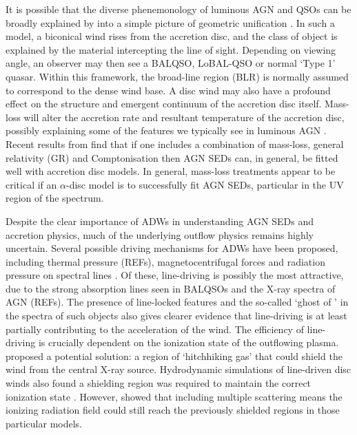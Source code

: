 \documentclass[useAMS,usenatbib]{mn2e_x}
\begin{document}
It is possible that the  diverse phenemonology
of luminous AGN and QSOs can be broadly explained by
into a simple picture of geometric unification \citep[e.g.][]{MCGV95, elvis2000}. 
In such a model, a biconical wind rises from 
the accretion disc, and the class of object is explained by the material
intercepting the line of sight. Depending on viewing angle, an observer 
may then see a BALQSO, LoBAL-QSO or normal `Type 1' quasar.
Within this framework, the broad-line region (BLR) is normally
assumed to correspond to the dense wind base.
A disc wind may also have a profound effect on the structure and 
emergent continuum of the accretion disc itself.
Mass-loss will alter the accretion rate and resultant 
temperature of the accretion disc, possibly explaining some 
of the features we typically see in luminous AGN \citep{laordavis2014}.
Recent results from \cite{capellupo2015} find 
that if one includes a combination of mass-loss, general relativity (GR) and Comptonisation
then AGN SEDs can, in general, be fitted well with accretion disc models.
In general, mass-loss treatments appear to be critical if an $\alpha$-disc
model is to successfully fit AGN SEDs, particular in the UV region of the spectrum.

Despite the clear importance of ADWs in understanding AGN SEDs and accretion physics, 
much of the underlying outflow physics remains highly uncertain. 
Several possible driving mechanisms for ADWs have been proposed, including
thermal pressure (REFs), magnetocentrifugal forces \citep{blandfordpayne} and 
radiation pressure on spectral lines \citep[`line-driving'][]{lucysolomon1970, MCGV95}.
Of these, line-driving is possibly the most attractive, due 
to the strong absorption lines seen in BALQSOs and the X-ray spectra of AGN (REFs).
The presence of line-locked features \citep{bowler2014} and the so-called `ghost of \la' \citep{arav1996}
in the spectra of such objects also gives clearer evidence that line-driving is
at least partially contributing to the acceleration of the wind.
The efficiency of line-driving is crucially dependent on the ionization state 
of the outflowing plasma. \cite{MCGV95} proposed a potential solution: 
a region of `hitchhiking gas' that could shield the wind from the central X-ray source. 
Hydrodynamic simulations of line-driven disc winds also found a shielding region
was required to maintain the correct ionization state \citep{PSK2000,PK04}. 
However, \cite{H14} showed that including multiple scattering means the ionizing radiation 
field could still reach the previously shielded regions in those particular models.
\end{document}
